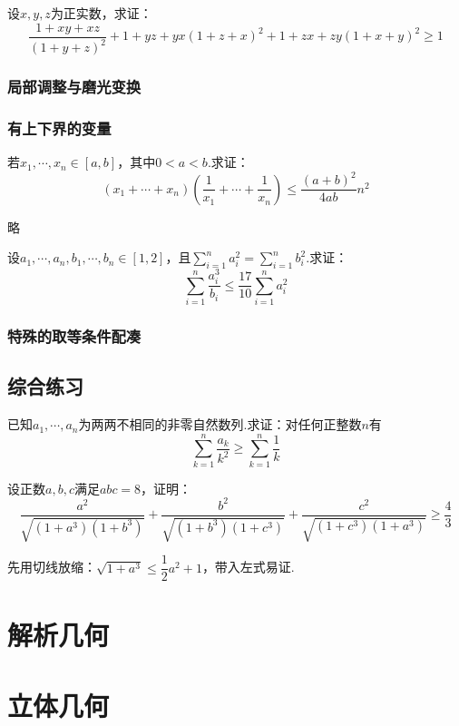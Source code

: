 \documentclass[cn,hazy,black,10pt,normal]{elegantnote}
\newcommand{\ssb}[1]{\left( #1 \right)}
\begin{document}
\begin{problem} %
	设$x,y,z$为正实数，求证：$$\frac{1+xy+xz}{(1+y+z)^2} + {1+yz+yx}{(1+z+x)^2} + {1+zx+zy}{(1+x+y)^2} \geq 1$$
\end{problem}

\subsection{局部调整与磨光变换}

\subsection{有上下界的变量}

\begin{problem} %
	若$x_1,\cdots ,x_n \in [a,b]$，其中$0<a<b$.求证：$$(x_1+ \cdots + x_n)\ssb{\frac{1}{x_1} + \cdots + \frac{1}{x_n}} \leq \frac{(a+b)^2}{4ab}n^2$$
\end{problem}
\begin{solution}
	略
\end{solution}

\begin{problem} %
	设$a_1, \cdots ,a_n , b_1 ,\cdots ,b_n \in [1,2]$，且$\sum_{i=1}^{n} a_i^2 = \sum_{i=1}^{n} b_i^2$.求证：$$\sum_{i=1}^{n} \frac{a_i^3}{b_i} \leq \frac{17}{10}\sum_{i=1}^{n} a_i^2$$
\end{problem}
\begin{solution}
\end{solution}

\subsection{特殊的取等条件配凑}

\section{综合练习}

\begin{problem} %
	已知$a_1, \cdots ,a_n$为两两不相同的非零自然数列.求证：对任何正整数$n$有$$\sum_{k=1}^{n} \frac{a_k}{k^2} \geq \sum_{k=1}^{n} \frac{1}{k}$$
\end{problem}
\begin{solution}
\end{solution}

\begin{problem} %
	设正数$a,b,c$满足$abc=8$，证明：$$\frac{a^2}{\sqrt{(1+a^3)(1+b^3)}} + \frac{b^2}{\sqrt{(1+b^3)(1+c^3)}} + \frac{c^2}{\sqrt{(1+c^3)(1+a^3)}} \geq \frac{4}{3}$$
\end{problem}
\begin{solution}
	先用切线放缩：$\sqrt{1+a^3} \leq \dfrac{1}{2}a^2+1$，带入左式易证.
\end{solution}

\chapter{解析几何}

\chapter{立体几何}
\end{document}
